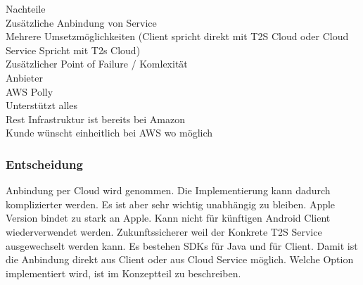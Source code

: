 Nachteile \\
Zusätzliche Anbindung von Service \\
Mehrere Umsetzmöglichkeiten (Client spricht direkt mit T2S Cloud oder Cloud Service Spricht mit T2s Cloud) \\
Zusätzlicher Point of Failure / Komlexität \\



Anbieter \\

AWS Polly \cite{aws_polly} \\
Unterstützt alles \\
Rest Infrastruktur ist bereits bei Amazon \\
Kunde wünscht einheitlich bei AWS wo möglich \\


\subsubsection{Entscheidung}

Anbindung per Cloud wird genommen.
Die Implementierung kann dadurch komplizierter werden.
Es ist aber sehr wichtig unabhängig zu bleiben.
Apple Version bindet zu stark an Apple.
Kann nicht für künftigen Android Client wiederverwendet werden.
Zukunftssicherer weil der Konkrete T2S Service ausgewechselt werden kann.
Es bestehen SDKs für Java und für Client.
Damit ist die Anbindung direkt aus Client oder aus Cloud Service möglich.
Welche Option implementiert wird, ist im Konzeptteil zu beschreiben.


\clearpage
